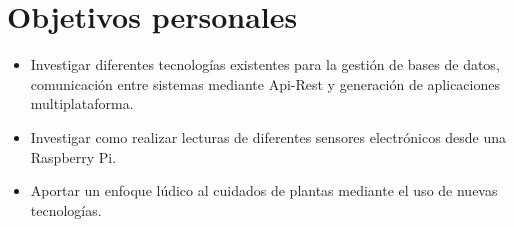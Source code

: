 \section{Objetivos personales}

\begin{itemize}
    \item Investigar diferentes tecnologías existentes para la gestión de bases de datos, comunicación entre sistemas mediante Api-Rest y generación de aplicaciones multiplataforma.
    \item Investigar como realizar lecturas de diferentes sensores electrónicos desde una Raspberry Pi.   
    \item Aportar un enfoque lúdico al cuidados de plantas mediante el uso de nuevas tecnologías.
\end{itemize}